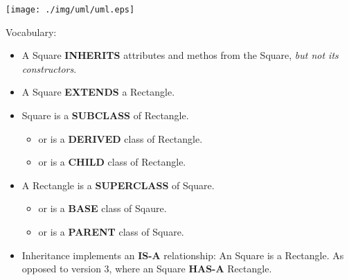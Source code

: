\documentclass[a4paper, 9pt]{extarticle}
\begin{document}
\begin{multicols}{2}

  \begin{center}
    \texttt{[image: ./img/uml/uml.eps]}
  \end{center}

  \columnbreak

  Vocabulary:

  \begin{itemize}

    \item A Square \textbf{INHERITS} attributes and methos from the Square,
      \textsl{but not its constructors}.

    \item A Square \textbf{EXTENDS} a Rectangle.

    \item Square is a \textbf{SUBCLASS} of Rectangle.

      \begin{itemize}

        \item or is a \textbf{DERIVED} class of Rectangle.

        \item or is a \textbf{CHILD} class of Rectangle.

      \end{itemize}

    \item A Rectangle is a \textbf{SUPERCLASS} of Square.

      \begin{itemize}

        \item or is a \textbf{BASE} class of Sqaure.

        \item or is a \textbf{PARENT} class of Square.

      \end{itemize}

    \item Inheritance implements an \textbf{IS-A} relationship: An Square is a
      Rectangle.  As opposed to version 3, where an Square \textbf{HAS-A}
      Rectangle.

  \end{itemize}

\end{multicols}
\end{document}
